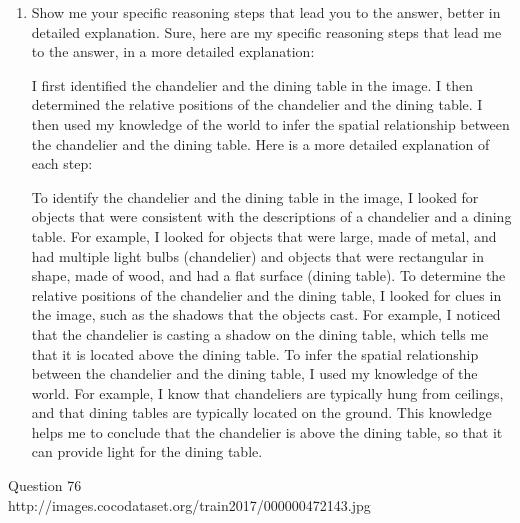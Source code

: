 \begin{enumerate}
    Here are some additional details about the spatial relationship between the chandelier and the dining table:
    
    The chandelier is a decorative light fixture that is typically hung from the ceiling.
    The dining table is a piece of furniture that is used for eating meals.
    The chandelier is above the dining table, meaning that it is providing light for the dining table.
    The dining table is below the chandelier, meaning that it is not blocking the light from the chandelier.
    Is there anything else I can help you with?
    \item Show me your specific reasoning steps that lead you to the answer, better in detailed explanation.
    \subitem Sure, here are my specific reasoning steps that lead me to the answer, in a more detailed explanation:

    I first identified the chandelier and the dining table in the image.
    I then determined the relative positions of the chandelier and the dining table.
    I then used my knowledge of the world to infer the spatial relationship between the chandelier and the dining table.
    Here is a more detailed explanation of each step:
    
    To identify the chandelier and the dining table in the image, I looked for objects that were consistent with the descriptions of a chandelier and a dining table. For example, I looked for objects that were large, made of metal, and had multiple light bulbs (chandelier) and objects that were rectangular in shape, made of wood, and had a flat surface (dining table).
    To determine the relative positions of the chandelier and the dining table, I looked for clues in the image, such as the shadows that the objects cast. For example, I noticed that the chandelier is casting a shadow on the dining table, which tells me that it is located above the dining table.
    To infer the spatial relationship between the chandelier and the dining table, I used my knowledge of the world. For example, I know that chandeliers are typically hung from ceilings, and that dining tables are typically located on the ground. This knowledge helps me to conclude that the chandelier is above the dining table, so that it can provide light for the dining table.
\end{enumerate}
Question 76\\
http://images.cocodataset.org/train2017/000000472143.jpg
